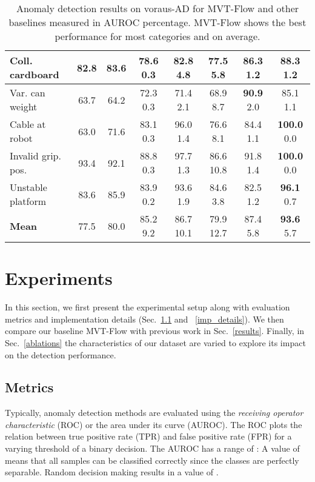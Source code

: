 \documentclass[journal]{IEEEtran}
\newcommand\datasetname{voraus-AD}
\begin{document}
\begin{table*}[h!b]
\begin{center}
\begin{tabular}{l c c c c c c c}
    Coll. cardboard & 82.8 & 83.6 & 78.6  0.3 &  82.8  4.8  & 77.5  5.8 & 86.3  1.2&  \textbf{88.3}  1.2\\ \hline
    Var. can weight& 63.7 & 64.2 & 72.3  0.3 &71.4  2.1  & 68.9  8.7 & \textbf{90.9}  2.0 &   85.1  1.1\\ \hline
    Cable at robot & 63.0 & 71.6 & 83.1  0.3 & 96.0  1.4 & 76.6  8.1 & 84.4  1.1 &  \textbf{100.0}  0.0\\ \hline
    Invalid grip. pos. & 93.4 & 92.1 & 88.8  0.3 & 97.7  1.3 & 86.6  10.8 & 91.8  1.4 &  \textbf{100.0}  0.0\\ \hline
    Unstable platform & 83.6 & 85.9 & 83.9  0.2  & 93.6  1.9 & 84.6  3.8 & 82.5  1.2 &  \textbf{96.1}  0.7\\ \hline
  \rowcolor[HTML]{EEEEEE} \textbf{Mean} & 77.5 & 80.0 & 85.2  9.2 & 86.7  10.1  &79.9  12.7 & 87.4  5.8  & \textbf{93.6}  5.7\\  \hline
    \end{tabular}
\end{center}
\vspace{-0.15cm}
\caption{Anomaly detection results on \datasetname{} for MVT-Flow and other baselines measured in AUROC percentage. MVT-Flow shows the best performance for most categories and {on average}.}
\label{table:results}
\vspace{-0.35cm}
\end{table*}



\section{Experiments}
In this section, we first present the experimental setup along with evaluation metrics and implementation details (Sec.~\ref{metrics} and ~\ref{imp_details}).
We then compare our baseline MVT-Flow with previous work in Sec.~\ref{results}.
Finally, in Sec.~\ref{ablations} the characteristics of our dataset are varied to explore its impact on the detection performance.
\subsection{Metrics}
\label{metrics}
Typically, anomaly detection methods are evaluated using the \textit{receiving operator characteristic} (ROC) or the area under its curve (AUROC).
The ROC plots the relation between true positive rate (TPR) and false positive rate (FPR) for a varying threshold  of a binary decision.
The AUROC has a range of :
A value of  means that all samples can be classified correctly since the classes are perfectly separable.
Random decision making results in a value of .
\end{document}
